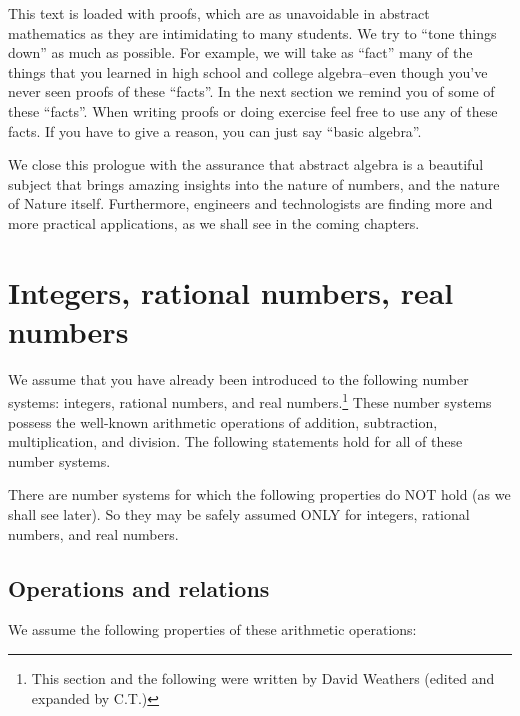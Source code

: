 This text is loaded with proofs, which are as unavoidable in abstract mathematics as they are intimidating to many students. We try to ``tone things down'' as much as possible. For example, we will take as ``fact'' many of the things that you learned in high school and  college algebra--even though you've never seen proofs of these ``facts''.  In the next section  we remind you of some of these ``facts''.  When writing proofs or doing exercise feel free to use any of these facts.  If you have to give a reason, you can just say  ``basic algebra''.

We close this prologue with the assurance that abstract algebra is a beautiful subject that brings amazing insights into the nature of numbers, and the nature of Nature itself. Furthermore, engineers and technologists are finding more and more practical applications, as we shall see in the coming chapters.



\section {Integers, rational numbers, real numbers}



We assume that you have already been introduced to the following number systems: integers, rational numbers, and real numbers.\footnote{This section and the following were written by David Weathers (edited and expanded by C.T.)}  These number systems possess the well-known arithmetic operations of addition, subtraction, multiplication, and division. The following statements hold for all of these number systems. 

\begin{warn}
There are number systems for which the following properties do NOT hold (as we shall see later). So they may be safely assumed ONLY for integers, rational numbers, and real numbers.
\end{warn}

\subsection{Operations and relations }\label{OpsAndRels}

We assume the following properties of these arithmetic operations:

